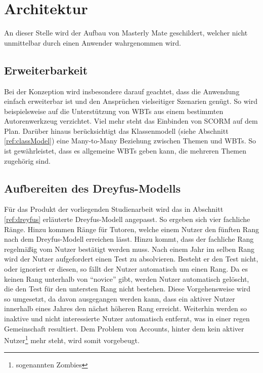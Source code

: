 \chapter{Architektur}
An dieser Stelle wird der Aufbau von Masterly Mate geschildert, welcher nicht
unmittelbar durch einen Anwender wahrgenommen wird.

\section{Erweiterbarkeit}
Bei der Konzeption wird insbesondere darauf geachtet, dass die Anwendung einfach
erweiterbar ist und den Ansprüchen vielseitiger Szenarien genügt.
So wird beispielsweise auf die Unterstützung von WBTs aus einem bestimmten
Autorenwerkzeug verzichtet. Viel mehr steht das Einbinden von SCORM auf dem
Plan. Darüber hinaus berücksichtigt das Klassenmodell (siehe Abschnitt
\ref{ref:classModel}) eine Many-to-Many Beziehung zwischen Themen und WBTs. So
ist gewährleistet, dass es allgemeine WBTs geben kann, die mehreren Themen
zugehörig sind.

\section{Aufbereiten des Dreyfus-Modells}\label{ref:dreyfusConcept} 
Für das Produkt der vorliegenden Studienarbeit wird das in Abschnitt
\ref{ref:dreyfus} erläuterte Dreyfus-Modell angepasst. So ergeben sich vier
fachliche Ränge. Hinzu kommen Ränge für Tutoren, welche einem Nutzer den fünften
Rang nach dem Dreyfus-Modell erreichen lässt. Hinzu kommt, dass der fachliche
Rang regelmäßig vom Nutzer bestätigt werden muss. Nach einem Jahr im selben Rang
wird der Nutzer aufgefordert einen Test zu absolvieren.
Besteht er den Test nicht, oder ignoriert er diesen, so fällt der Nutzer
automatisch um einen Rang. Da es keinen Rang unterhalb von "`novice"' gibt,
werden Nutzer automatisch gelöscht, die den Test für den untersten Rang nicht
bestehen. Diese Vorgehensweise wird so umgesetzt, da davon ausgegangen werden
kann, dass ein aktiver Nutzer innerhalb eines Jahres den nächst höheren Rang
erreicht. Weiterhin werden so inaktive und nicht interessierte Nutzer
automatisch entfernt, was in einer regen Gemeinschaft resultiert. Dem Problem
von Accounts, hinter dem kein aktiver Nutzer\footnote{sogenannten Zombies} mehr
steht, wird somit vorgebeugt.

